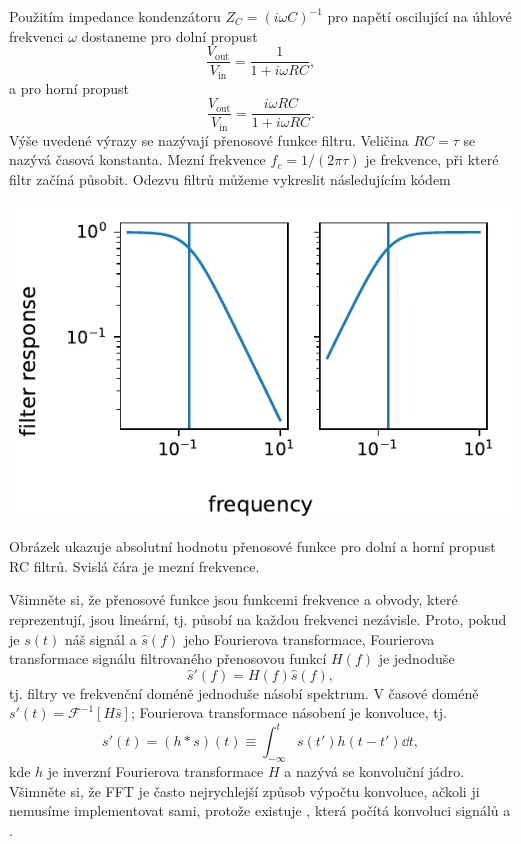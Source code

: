 Použitím impedance kondenzátoru $Z_C = (i\omega C)^{-1}$ pro napětí oscilující na úhlové frekvenci $\omega$ dostaneme pro dolní propust
\begin{equation}
    \frac{V_\mathrm{out}}{V_\mathrm{in}} = \frac{1}{1 + i\omega RC},
\end{equation}
a pro horní propust
\begin{equation}
    \frac{V_\mathrm{out}}{V_\mathrm{in}} = \frac{i\omega RC}{1 + i\omega RC}.
\end{equation}
Výše uvedené výrazy se nazývají přenosové funkce filtru. Veličina $RC = \tau$ se nazývá časová konstanta. Mezní frekvence $f_c = 1/(2\pi\tau)$ je frekvence, při které filtr začíná působit. Odezvu filtrů můžeme vykreslit následujícím kódem

\begin{center}
    \includegraphics{RC_filters.pdf}
\end{center}
Obrázek ukazuje absolutní hodnotu přenosové funkce pro dolní a horní propust RC filtrů. Svislá čára je mezní frekvence.

Všimněte si, že přenosové funkce jsou funkcemi frekvence a obvody, které reprezentují, jsou lineární, tj. působí na každou frekvenci nezávisle. Proto, pokud je $s(t)$ náš signál a $\hat s(f)$ jeho Fourierova transformace, Fourierova transformace signálu filtrovaného přenosovou funkcí $H(f)$ je jednoduše
\begin{equation}
    \hat s'(f) = H(f)\hat s(f),
\end{equation}
tj. filtry ve frekvenční doméně jednoduše násobí spektrum. V časové doméně $s'(t) = \mathcal{F}^{-1}[H\hat s]$; Fourierova transformace násobení je konvoluce, tj.
\begin{equation}
    s'(t) = (h*s)(t) \equiv \int_{-\infty}^t s(t')h(t - t')\dd t,
\end{equation}
kde $h$ je inverzní Fourierova transformace $H$ a nazývá se konvoluční jádro. Všimněte si, že FFT je často nejrychlejší způsob výpočtu konvoluce, ačkoli ji nemusíme implementovat sami, protože existuje , která počítá konvoluci signálů  a .

